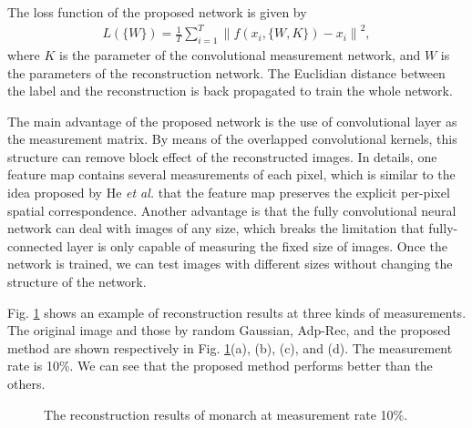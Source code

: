 \documentclass[review]{elsarticle}
\begin{document}
The loss function of the proposed network is given by
\begin{eqnarray}\label{equation2}
L(\{W\})=\frac{1}{T}\sum_{i=1}^{T}{\lVert f(x_i,\{W,K\})-x_i \rVert}^2,
\end{eqnarray}
where $K$ is the parameter of the convolutional measurement network, and $W$ is the parameters of the reconstruction network. The Euclidian distance between the label and the reconstruction is back propagated to train the whole network.

The main advantage of the proposed network is the use of convolutional layer as the measurement matrix. By means of the overlapped convolutional kernels, this structure can remove block effect of the reconstructed images. In details, one feature map contains several measurements of each pixel, which is similar to the idea proposed by He \emph{et al.} \cite{he2017mask} that the feature map preserves the explicit per-pixel spatial correspondence. Another advantage is that the fully convolutional neural network can deal with images of any size, which breaks the limitation that fully-connected layer is only capable of measuring the fixed size of images. Once the network is trained, we can test images with different sizes without changing the structure of the network.

Fig. \ref{fig:Monarch} shows an example of reconstruction results at three kinds of measurements. The original image and those by random Gaussian, Adp-Rec, and the proposed method are shown respectively in Fig. \ref{fig:Monarch}(a), (b), (c), and (d). The measurement rate is 10\%. We can see that the proposed method performs better than the others.

\begin{figure}[h!]
	\centering
	 \qquad
	 \qquad
	 \qquad
	\caption{The reconstruction results of monarch at measurement rate 10\%.}
	\label{fig:Monarch}
\end{figure}
\end{document}

